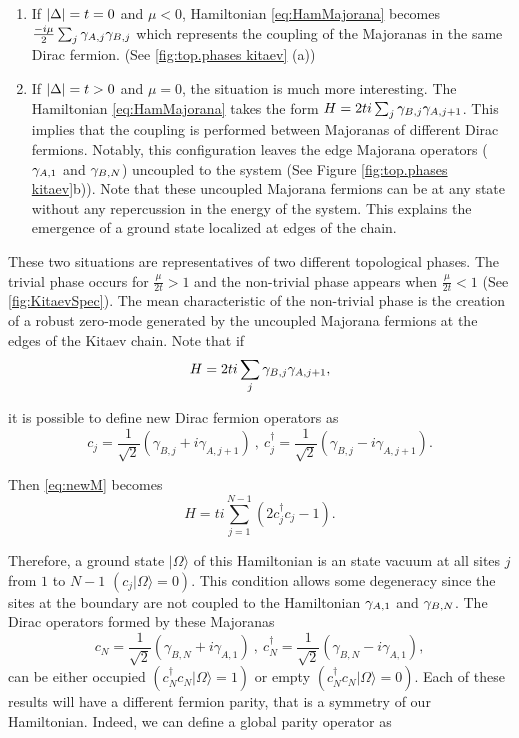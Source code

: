 \begin{enumerate}

  \item If $\vert \Delta \vert = t = 0$ and $\mu <0$, Hamiltonian \eqref{eq:HamMajorana} becomes $\frac{-i\mu}{2} \sum_{j} \gamma_{A,j}\gamma_{B,j}$ which represents the coupling of the Majoranas in the same Dirac fermion. (See \ref{fig:top.phases kitaev} (a))

  \item If $\vert \Delta \vert = t > 0$ and $\mu =0$, the situation is much more interesting. The Hamiltonian \eqref{eq:HamMajorana} takes the form $H = 2ti\sum_{j}  \gamma_{B,j}\gamma_{A,j+1} $. This implies that the coupling is performed between  Majoranas of different Dirac fermions. Notably, this configuration leaves the edge Majorana operators ($\gamma_{A,1}$ and $\gamma_{B,N}$) uncoupled to the system (See Figure \ref{fig:top.phases kitaev}b)). Note that these uncoupled Majorana fermions can be at any state without any  repercussion in the energy of the system. This explains the emergence of a  ground state localized at edges of the chain. 
\end{enumerate}

These two situations are representatives of two different topological phases. The trivial phase occurs for $\frac{\mu}{2t}>1$ and the non-trivial phase appears when $\frac{\mu}{2t}<1$ (See \ref{fig:KitaevSpec}). The mean characteristic of the non-trivial phase  is the creation of a robust zero-mode generated by the  uncoupled Majorana fermions at the edges of the Kitaev chain. Note that if
\begin{equation}
H = 2ti\sum_{j}  \gamma_{B,j}\gamma_{A,j+1}, \label{eq:newM} 
\end{equation}
  
\noindent it is possible to define new Dirac fermion operators as 
$$c_j = \frac{1}{\sqrt{2}} \left( \gamma_{B,j}+ i\gamma_{A,j+1} \right) \ , \ c^\dagger_j = \frac{1}{\sqrt{2}} \left( \gamma_{B,j}- i\gamma_{A,j+1} \right). $$

\noindent Then \eqref{eq:newM} becomes 
\begin{equation}
H = ti\sum_{j=1}^{N-1} \left(  2c^\dagger_jc_j-1 \right). \label{eq:newM} 
\end{equation}

Therefore, a ground state $\vert \Omega \rangle$ of this Hamiltonian is an state vacuum at all sites $j$ from $1$ to $N-1$ $(c_j\vert \Omega \rangle = 0)$. This condition allows some degeneracy since the sites at the boundary are not coupled to the Hamiltonian $\gamma_{A,1}$ and $\gamma_{B,N}$. The Dirac  operators formed by these Majoranas 
$$c_N = \frac{1}{\sqrt{2}} \left( \gamma_{B,N}+ i\gamma_{A,1} \right) \ , \ c^\dagger_N = \frac{1}{\sqrt{2}} \left( \gamma_{B,N}- i\gamma_{A,1} \right), $$ 
can be either occupied $(c^\dagger_N c_N \vert \Omega \rangle = 1)$ or empty $(c^\dagger_N c_N \vert \Omega \rangle = 0)$. Each of these results will have a different fermion parity, that is a  symmetry of our Hamiltonian.   Indeed, we can define a global parity operator as 

